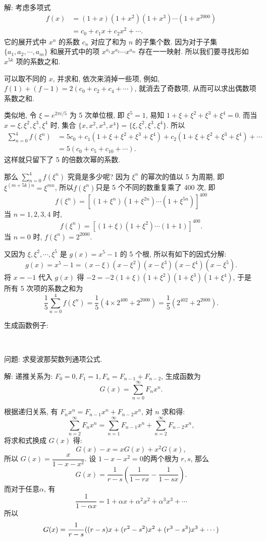 ~

\noindent 解: 考虑多项式 
\begin{align*}
f(x) &= (1+x)(1+x^2)(1+x^3)\cdots(1+x^{2000}) \\
&= c_0 + c_1x + c_2x^2 + \cdots .
\end{align*}
它的展开式中 $x^n$ 的系数 $c_n$ 对应了和为 $n$ 的子集个数. 因为对于子集 $\{a_1, a_2, \cdots, a_m\}$ 和展开式中的项 $x^{a_1}x^{a_2}\cdots x^{a_m}$ 存在一一映射. 所以我们要寻找形如 $x^{5k}$ 项的系数之和.

可以取不同的 $x$, 并求和, 依次来消掉一些项, 例如, $f(1)+(f-1) = 2(c_0+c_2+c_4+\cdots)$, 就消去了奇数项, 从而可以求出偶数项系数之和.

类似地, 令 $ \xi = e^{2\pi i/5}$ 为 5 次单位根, 即 $\xi^5 = 1$, 易知 $1+\xi+\xi^2+\xi^3+\xi^4=0$. 而当$x = \xi, \xi^2, \xi^3, \xi^4$ 时, 集合 $\{x, x^2, x^3, x^4\} = \{\xi, \xi^2, \xi^3, \xi^4\}$. 所以
\begin{align*}
\sum_{n=0}^4{f(\xi^n)} &= 5c_0 + c_1(1+\xi+\xi^2+\xi^3+\xi^4)+c_2(1+\xi+\xi^2+\xi^3+\xi^4) + \cdots \\
&= 5(c_0+c_5+c_{10} + \cdots ).
\end{align*}
这样就只留下了 5 的倍数次幂的系数.

那么 $\displaystyle \sum_{n=0}^4{f(\xi^n)}$ 究竟是多少呢? 因为 $\xi^n$ 的幂次的值以 5 为周期, 即$\xi^{(m+5k)n}=\xi^{mn}$, 所以$f(\xi^n)$只是 5 个不同的数重复乘了 400 次, 即 
\[f(\xi^n)=\left[(1+\xi^n)(1+\xi^{2n})\cdots(1+\xi^{5n})\right]^{400}\]
当 $n=1,2,3,4$ 时,
\[f(\xi^n) = \left[(1+\xi)(1+\xi^{2})\cdots(1+1)\right]^{400}.\]
当 $n=0$ 时, $f(\xi^n)=2^{2000}$.

又因为 $\xi, \xi^2, \cdots, \xi^5$ 是 $g(x)=x^5-1$ 的 5 个根, 所以有如下的因式分解:
\[g(x) = x^5-1=(x-\xi)(x-\xi^2)(x-\xi^3)(x-\xi^4)(x-\xi^5).\]
将 $x=-1$ 代入 $g(x)$ 得 $-2 = -2(1+\xi)(1+\xi^2)(1+\xi^3)(1+\xi^4)$, 于是所有 5 次项的系数之和为
\[\frac{1}{5}\sum_{n=0}^4{f(\xi^n)}=\frac{1}{5}\left(4\times 2^{400}+2^{2000}\right) = \frac{1}{5}\left(2^{402}+2^{2000}\right).\]


\newpage
\noindent 生成函数例子:

~

\noindent 问题: 求斐波那契数列通项公式.

\noindent 解: 递推关系为: $F_0=0, F_1=1, F_n = F_{n-1} + F_{n-2}$, 生成函数为 
\[
G(x) = \sum_{n=0}^\infty{F_nx^n} .
\]

根据递归关系, 有 $ F_nx^n = F_{n-1}x^n+F_{n-2}x^n $, 对 $n$ 求和得:
\[
\sum_{n=2}^{\infty}{F_nx^n} = \sum_{n=1}^{\infty}{F_{n-1}x^n} + \sum_{n=2}^{\infty}{F_{n-2}x^n} ,
\]
将求和式换成 $G(x)$ 得:
\[
G(x) - x = xG(x) + x^2G(x) ,
\]
所以 $G(x) = \dfrac{x}{1-x-x^2}$. 设 $1-x-x^2=0$的两个根为 $r,s$, 那么
\[
G(x) = \frac{1}{r-s}\left(\frac{1}{1-rx} - \frac{1}{1-sx}\right) .
\]
而对于任意$\alpha$, 有 
\[\frac{1}{1-\alpha x} = 1+\alpha x+\alpha^2x^2 + \alpha^3x^3 + \cdots\]
所以
\[
G(x) = \frac{1}{r-s}((r-s)x + (r^2-s^2)x^2 + (r^3-s^3)x^3 + \cdots) \\
\]

